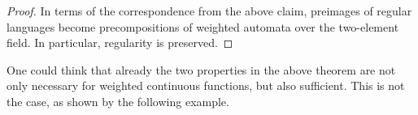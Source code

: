 \begin{proof}
        In terms of the correspondence from the above claim, preimages of regular languages become precompositions of weighted automata over the two-element field. In particular, regularity is preserved. 
\end{proof}

One could think that already the two properties in the above theorem are not only necessary for weighted continuous functions, but also sufficient. This is not the case, as shown by the following example.

